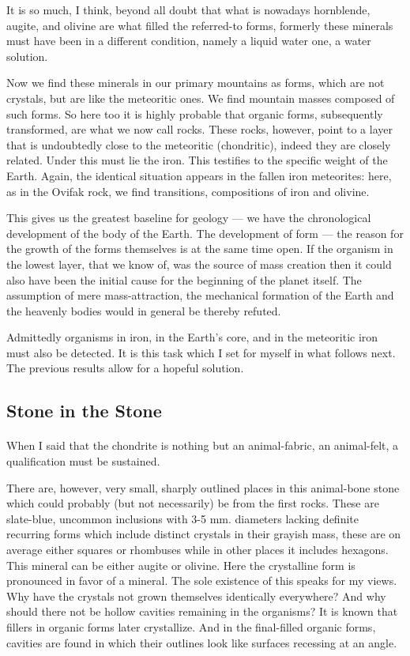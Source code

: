 \documentclass[a4paper, 12pt, oneside]{article}
\begin{document}
It is so much, I think, beyond all doubt that what is nowadays hornblende, augite, and olivine are what filled the referred-to forms, formerly these minerals must have been in a different condition, namely a liquid water one, a water solution.

Now we find these minerals in our primary mountains as forms, which are not crystals, but are like the meteoritic ones. We find mountain masses composed of such forms. So here too it is highly probable that organic forms, subsequently transformed, are what we now call rocks. These rocks, however, point to a layer that is undoubtedly close to the meteoritic (chondritic), indeed they are closely related. Under this must lie the iron. This testifies to the specific weight of the Earth. Again, the identical situation appears in the fallen iron meteorites: here, as in the Ovifak rock, we find transitions, compositions of iron and olivine.

This gives us the greatest baseline for geology --- we have the chronological development of the body of the Earth. The development of form --- the reason for the growth of the forms themselves is at the same time open. If the organism in the lowest layer, that we know of, was the source of mass creation then it could also have been the initial cause for the beginning of the planet itself. The assumption of mere mass-attraction, the mechanical formation of the Earth and the heavenly bodies would in general be thereby refuted.

Admittedly organisms in iron, in the Earth's core, and in the meteoritic iron must also be detected. It is this task which I set for myself in what follows next. The previous results allow for a hopeful solution.
\clearpage
\subsection{Stone in the Stone}
\paragraph*{}
When I said that the chondrite is nothing but an animal-fabric, an animal-felt, a qualification must be sustained.

There are, however, very small, sharply outlined places in this animal-bone stone which could probably (but not necessarily) be from the first rocks. These are slate-blue, uncommon inclusions with 3-5 mm. diameters lacking definite recurring forms which include distinct crystals in their grayish mass, these are on average either squares or rhombuses while in other places it includes hexagons. This mineral can be either augite or olivine. Here the crystalline form is pronounced in favor of a mineral. The sole existence of this speaks for my views. Why have the crystals not grown themselves identically everywhere? And why should there not be hollow cavities remaining in the organisms? It is known that fillers in organic forms later crystallize. And in the final-filled organic forms, cavities are found in which their outlines look like surfaces recessing at an angle.
\end{document}

